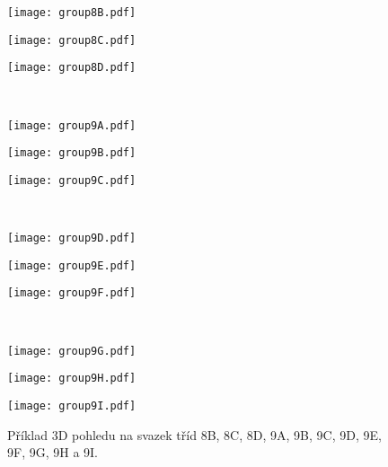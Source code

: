 \begin{figure}[htps]
\centering
\begin{minipage}[c]{0.325\textwidth}
\texttt{[image: group8B.pdf]}
\end{minipage}
\begin{minipage}[c]{0.325\textwidth}
\texttt{[image: group8C.pdf]}
\end{minipage}
\begin{minipage}[c]{0.325\textwidth}
\texttt{[image: group8D.pdf]}
\end{minipage}\\

\begin{minipage}[c]{0.325\textwidth}
\texttt{[image: group9A.pdf]}
\end{minipage}
\begin{minipage}[c]{0.325\textwidth}
\texttt{[image: group9B.pdf]}
\end{minipage}
\begin{minipage}[c]{0.325\textwidth}
\texttt{[image: group9C.pdf]}
\end{minipage}\\

\begin{minipage}[c]{0.325\textwidth}
\texttt{[image: group9D.pdf]}
\end{minipage}
\begin{minipage}[c]{0.325\textwidth}
\texttt{[image: group9E.pdf]}
\end{minipage}
\begin{minipage}[c]{0.325\textwidth}
\texttt{[image: group9F.pdf]}
\end{minipage}\\

\begin{minipage}[c]{0.325\textwidth}
\texttt{[image: group9G.pdf]}
\end{minipage}
\begin{minipage}[c]{0.325\textwidth}
\texttt{[image: group9H.pdf]}
\end{minipage}
\begin{minipage}[c]{0.325\textwidth}
\texttt{[image: group9I.pdf]}
\end{minipage}

\caption{Příklad 3D pohledu na svazek tříd 8B, 8C, 8D, 9A, 9B, 9C, 9D, 9E, 9F, 9G, 9H a 9I.}
\label{fig:modelClass3D4}
\end{figure}

